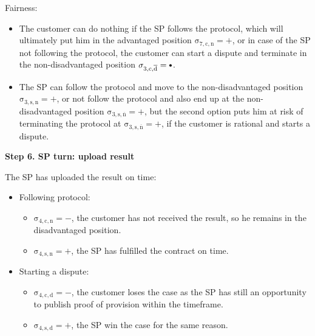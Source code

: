 \documentclass{ieeeaccess}
\newcommand\sbullet[1][.75]{\mathbin{\ThisStyle{\vcenter{\hbox{%
  \scalebox{#1}{$\SavedStyle\bullet$}}}}}%
}
\begin{document}
Fairness:

\begin{itemize}

\item
  The customer can do nothing if the SP follows the protocol, which will ultimately put him in the advantaged position \(\operatorname{\sigma_{7, c, n} = +}\), or in case of the SP not following the protocol, the customer can start a dispute and terminate in the non-disadvantaged position \(\operatorname{\sigma_{3, c, \overline{d}} = \sbullet}\).
\item
  The SP can follow the protocol and move to the non-disadvantaged position \(\operatorname{\sigma_{3, s, n} = +}\), or not follow the protocol and also end up at the non-disadvantaged position \(\operatorname{\sigma_{3, s, \overline{n}} = +}\), but the second option puts him at risk of terminating the protocol at \(\operatorname{\sigma_{3, s, \overline{n}} = +}\), if the customer is rational and starts a dispute.
\end{itemize}

\noindent \textbf
{Step 6. SP turn: upload result}\label{step-6-publication-of-results}

The SP has uploaded the result on time:

\begin{itemize}
\item
  Following protocol:

  \begin{itemize}
  
  \item
    \(\operatorname{\sigma_{4, c, n} = -}\), the customer has not received the result, so he remains in the disadvantaged position. 
  \item
    \(\operatorname{\sigma_{4, s, n} = +}\), the SP has fulfilled the contract on time.
  \end{itemize}
\item
  Starting a dispute:

  \begin{itemize}
  
  \item
    \(\operatorname{\sigma_{4, c, d} = -}\), the customer loses the case as the SP has still an opportunity to publish proof of provision within the timeframe. 
  \item
    \(\operatorname{\sigma_{4, s, d} = +}\), the SP win the case for the same reason.
  \end{itemize}
\end{itemize}
\end{document}
